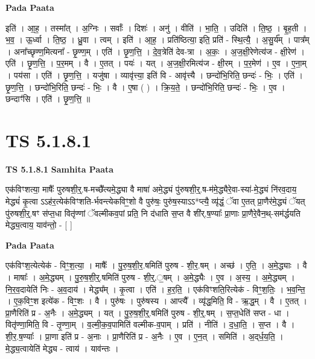 \documentclass[17pt]{extarticle}
\begin{document}
\textbf{Pada Paata} \newline

इति॑ । आ॒ह॒ । तस्मा᳚त् । अ॒ग्निः । सर्वाः᳚ । दिशः॑ । अनु॑ । वीति॑ । भा॒ति॒ । उदिति॑ । ति॒ष्ठ॒ । बृ॒ह॒ती । भ॒व॒ । ऊ॒र्ध्वा । ति॒ष्ठ॒ । ध्रु॒वा । त्वम् । इति॑ । आ॒ह॒ । प्रति॑ष्ठित्या॒ इति॒ प्रति॑ - स्थि॒त्यै॒ । अ॒सु॒र्य᳚म् । पात्र᳚म् । अना᳚च्छृण्ण॒मित्यना᳚ - छृ॒ण्ण॒म् । एति॑ । छृ॒ण॒त्ति॒ । दे॒व॒त्रेति॑ देव-त्रा । अ॒कः॒ । अ॒ज॒क्षी॒रेणेत्य॑ज - क्षी॒रेण॑ । एति॑ । छृ॒ण॒त्ति॒ । प॒र॒मम् । वै । ए॒तत् । पयः॑ । यत् । अ॒ज॒क्षी॒रमित्य॑ज - क्षी॒रम् । प॒र॒मेण॑ । ए॒व । ए॒ना॒म् । पय॑सा । एति॑ । छृ॒ण॒त्ति॒ । यजु॑षा । व्यावृ॑त्त्या॒ इति॑ वि - आवृ॑त्त्यै । छन्दो॑भि॒रिति॒ छन्दः॑ - भिः॒ । एति॑ । छृ॒ण॒त्ति॒ । छन्दो॑भि॒रिति॒ छन्दः॑ - भिः॒ । वै । ए॒षा ( ) । क्रि॒य॒ते॒ । छन्दो॑भि॒रिति॒ छन्दः॑ - भिः॒ । ए॒व । छन्दाꣳ॑सि । एति॑ । छृ॒ण॒त्ति॒ ॥  \newline




\section*{ TS 5.1.8.1 }

\textbf{TS 5.1.8.1 } \newline
\textbf{Samhita Paata} \newline

एक॑विꣳशत्या॒ माषैः᳚ पुरुषशी॒र्॒.ष-मच्छै᳚त्यमे॒द्ध्या वै माषा॑ अमे॒द्ध्यं पु॑रुषशी॒र्॒.ष-म॑मे॒द्ध्यैरे॒वा-स्या॑-मे॒द्ध्यं नि॑रव॒दाय॒ मेद्ध्यं॑ कृ॒त्वा ऽऽह॑र॒त्येक॑विꣳशति-र्भवन्त्येकविꣳ॒॒शो वै पुरु॑षः॒ पुरु॑ष॒स्याऽऽ*प्त्यै॒ व्यृ॑द्धं॒ ॅवा ए॒तत् प्रा॒णैर॑मे॒द्ध्यं ॅयत् पु॑रुषशी॒र्॒.षꣳ स॑प्त॒धा वितृ॑ण्णां ॅवल्मीकव॒पां प्रति॒ नि द॑धाति स॒प्त वै शी॑र्.ष॒ण्याः᳚ प्रा॒णाः प्रा॒णैरे॒वैन॒थ्-सम॑र्द्धयति मेद्ध्य॒त्वाय॒ याव॑न्तो॒ - [  ] \newline

\textbf{Pada Paata} \newline

एक॑विꣳश॒त्येत्येक॑ - विꣳ॒॒श॒त्या॒ । माषैः᳚ । पु॒रु॒ष॒शी॒र॒.षमिति॑ पुरुष - शी॒र॒.षम् । अच्छ॑ । ए॒ति॒ । अ॒मे॒द्ध्याः । वै । माषाः᳚ । अ॒मे॒द्ध्यम् । पु॒रु॒ष॒शी॒र्॒.षमिति॑ पुरुष - शी॒र्॒.॒षम् । अ॒मे॒द्ध्यैः । ए॒व । अ॒स्य॒ । अ॒मे॒द्ध्यम् । नि॒र॒व॒दायेति॑ निः - अ॒व॒दाय॑ । मेद्ध्य᳚म् । कृ॒त्वा । एति॑ । ह॒र॒ति॒ । एक॑विꣳशति॒रित्येक॑ - विꣳ॒॒श॒तिः॒ । भ॒व॒न्ति॒ । ए॒क॒विꣳ॒॒श इत्ये॑क - विꣳ॒॒शः । वै । पुरु॑षः । पुरु॑षस्य । आप्त्यै᳚ । व्यृ॑द्ध॒मिति॒ वि - ऋ॒द्ध॒म् । वै । ए॒तत् । प्रा॒णैरिति॑ प्र - अ॒नैः । अ॒मे॒द्ध्यम् । यत् । पु॒रु॒ष॒शी॒र्॒.षमिति॑ पुरुष - शी॒र्॒.षम् । स॒प्त॒धेति॑ सप्त - धा । वितृ॑ण्णा॒मिति॒ वि - तृ॒ण्णा॒म् । व॒ल्मी॒क॒व॒पामिति॑ वल्मीक-व॒पाम् । प्रति॑ । नीति॑ । द॒धा॒ति॒ । स॒प्त । वै । शी॒र॒.ष॒ण्याः᳚ । प्रा॒णा इति॑ प्र - अ॒नाः । प्रा॒णैरिति॑ प्र - अ॒नैः । ए॒व । ए॒न॒त् । समिति॑ । अ॒द्‌र्ध॒य॒ति॒ । मे॒द्ध्य॒त्वायेति॑ मेद्ध्य - त्वाय॑ । याव॑न्तः ।  \newline
\end{document}
